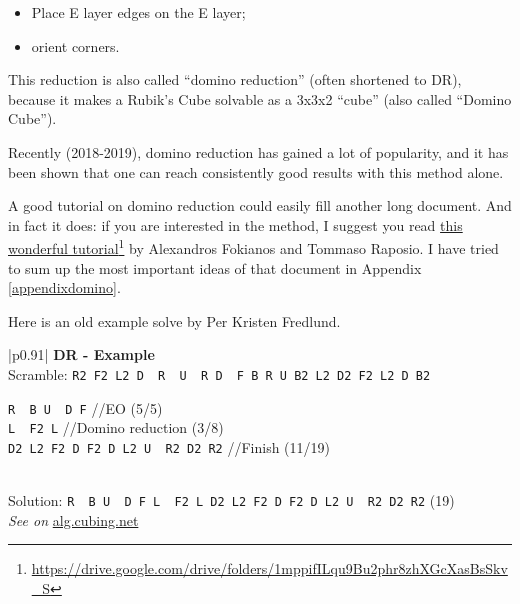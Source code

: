 \documentclass[11pt,a4paper]{book}
\newcommand{\p}{\textquotesingle}
\newcommand{\m}{\texttt}
\newcommand{\ps}{\p\,\,}
\newcommand{\comment}[1]{{\color{gray}\quad//#1}}
\begin{document}
\begin{itemize}
\item Place E layer edges on the E layer;
\item orient corners.
\end{itemize}

This reduction is also called ``domino reduction'' (often shortened to DR), because it makes a Rubik's Cube solvable as a 3x3x2 ``cube'' (also called ``Domino Cube'').

Recently (2018-2019), domino reduction has gained a lot of popularity, and it has been shown that one can reach consistently good results with this method alone.

A good tutorial on domino reduction could easily fill another long document. And in fact it does: if you are interested in the method, I suggest you read \href{https://drive.google.com/drive/folders/1mppifILqu9Bu2phr8zhXGcXasBsSkv_S}{this wonderful tutorial}\footnote{\url{https://drive.google.com/drive/folders/1mppifILqu9Bu2phr8zhXGcXasBsSkv_S}} by Alexandros Fokianos and Tommaso Raposio. I have tried to sum up the most important ideas of that document in Appendix \ref{appendixdomino}.

Here is an old example solve by Per Kristen Fredlund.

\bigskip
\begin{tabular}{|p{}|}
\hline
\textbf{DR - Example}\\
\hline
Scramble: \m{R2 F2 L2 D\ps R\ps U\ps R D\ps F B R U B2 L2 D2 F2 L2 D B2}\\
\hline
\begin{minipage}[l]{0.650\textwidth}
\m{R\ps B U\ps D F} \comment{EO (5/5)}\\
\m{L\ps F2 L} \comment{Domino reduction (3/8)}\\
\m{D2 L2 F2 D F2 D L2 U\ps R2 D2 R2} \comment{Finish (11/19)}
\end{minipage}
\begin{minipage}[c]{0.25\textwidth}

\end{minipage}\\
\hline
Solution: \m{R\ps B U\ps D F L\ps F2 L D2 L2 F2 D F2 D L2 U\ps R2 D2 R2} (19)\\
\hline
\emph{See on }\href{https://alg.cubing.net/?setup=R2_F2_L2_D-_R-_U-_R_D-_F_B_R_U_B2_L2_D2_F2_L2_D_B2&alg=R-_B_U-_D_F_\%2F\%2FEO_(5\%2F5)\%0AL-_F2_L_\%2F\%2FDomino_Reduction(3\%2F8)\%0AD2_L2_F2_D_F2_D_L2_U-_R2_D2_R2_\%2F\%2FFinish_(11\%2F19)}{alg.cubing.net}\\
\hline
\end{tabular}
\bigskip
\end{document}

